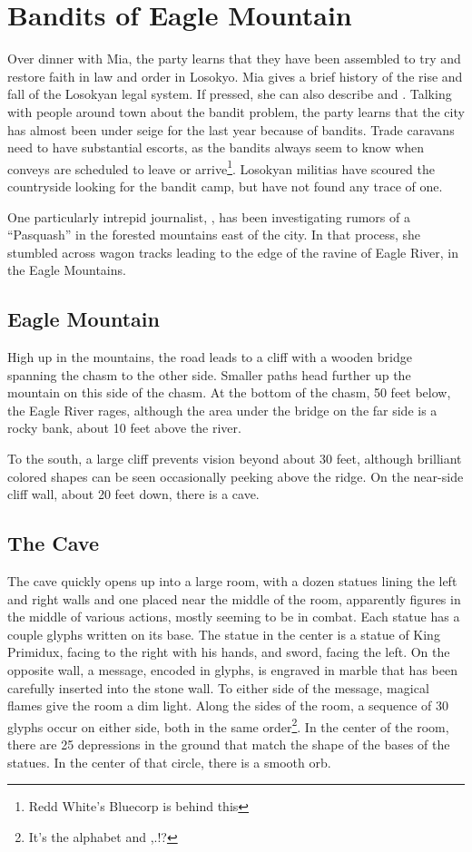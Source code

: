 \section{Bandits of Eagle Mountain}

Over dinner with Mia, the party learns that they have been assembled to try and restore faith in law and order in Losokyo. Mia gives a brief history of the rise and fall of the Losokyan legal system. If pressed, she can also describe  and .
Talking with people around town about the bandit problem, the party learns that the city has almost been under seige for the last year because of bandits. Trade caravans need to have substantial escorts, as the bandits always seem to know when conveys are scheduled to leave or arrive\footnote{Redd White's Bluecorp is behind this}. Losokyan militias have scoured the countryside looking for the bandit camp, but have not found any trace of one.

One particularly intrepid journalist, , has been investigating rumors of a ``Pasquash'' in the forested mountains east of the city. In that process, she stumbled across wagon tracks leading to the edge of the ravine of Eagle River, in the Eagle Mountains. 

\subsection{Eagle Mountain}
High up in the mountains, the road leads to a cliff with a wooden bridge spanning the chasm to the other side. Smaller paths head further up the mountain on this side of the chasm. At the bottom of the chasm, 50 feet below, the Eagle River rages, although the area under the bridge on the far side is a rocky bank, about 10 feet above the river. 

To the south, a large cliff prevents vision beyond about 30 feet, although brilliant colored shapes can be seen occasionally peeking above the ridge. On the near-side cliff wall, about 20 feet down, there is a cave. 

\subsection{The Cave}
The cave quickly opens up into a large room, with a dozen statues lining the left and right walls and one placed near the middle of the room, apparently figures in the middle of various actions, mostly seeming to be in combat. Each statue has a couple glyphs written on its base. The statue in the center is a statue of King Primidux, facing to the right with his hands, and sword, facing the left. On the opposite wall, a message, encoded in glyphs, is engraved in marble that has been carefully inserted into the stone wall. To either side of the message, magical flames give the room a dim light. Along the sides of the room, a sequence of 30 glyphs occur on either side, both in the same order\footnote{It's the alphabet and ,.!?}. In the center of the room, there are 25 depressions in the ground that match the shape of the bases of the statues. In the center of that circle, there is a smooth orb.

